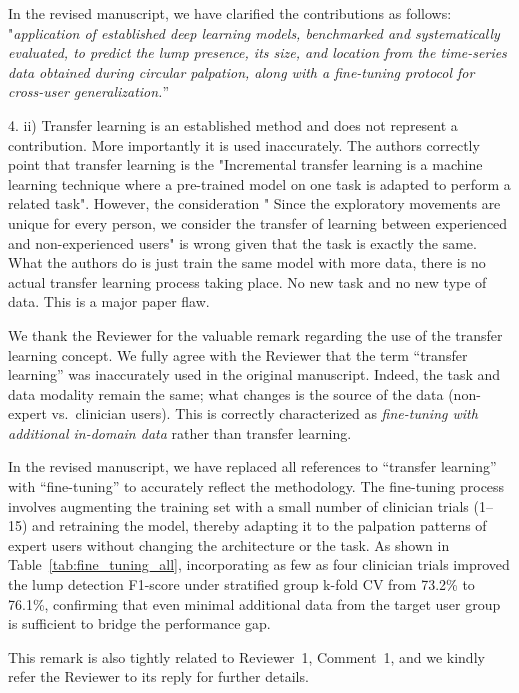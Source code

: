 \documentclass[a4paper, onecolumn]{IEEEtran}
\newcommand\blue[1]{{\textcolor{white!30!blue}{#1}}}
\begin{document}
In the revised manuscript, we have clarified the contributions as follows:
"\textit{application of established deep learning models, benchmarked and systematically evaluated, to predict the lump presence, its size, and location from the time-series data obtained during circular palpation, along with a fine-tuning protocol for cross-user generalization.}''

\blue{4. ii) Transfer learning is an established method and does not represent a contribution. More importantly it is used inaccurately. The authors correctly point that transfer learning is the "Incremental transfer learning is a machine learning technique where a pre-trained model on one task is adapted to perform a related task". However, the consideration " Since the exploratory movements are unique for every person, we consider the transfer of learning between experienced and non-experienced users" is wrong given that the task is exactly the same. What the authors do is just train the same model with more data, there is no actual transfer learning process taking place. No new task and no new type of data. This is a major paper flaw.}

We thank the Reviewer for the valuable remark regarding the use of the transfer learning concept. We fully agree with the Reviewer that the term ``transfer learning'' was inaccurately used in the original manuscript. Indeed, the task and data modality remain the same; what changes is the source of the data (non-expert vs.~clinician users). This is correctly characterized as \textit{fine-tuning with additional in-domain data} rather than transfer learning.

In the revised manuscript, we have replaced all references to ``transfer learning'' with ``fine-tuning'' to accurately reflect the methodology. The fine-tuning process involves augmenting the training set with a small number of clinician trials (1--15) and retraining the model, thereby adapting it to the palpation patterns of expert users without changing the architecture or the task. As shown in Table~\ref{tab:fine_tuning_all}, incorporating as few as four clinician trials improved the lump detection F1-score under stratified group k-fold CV from 73.2\% to 76.1\%, confirming that even minimal additional data from the target user group is sufficient to bridge the performance gap.

This remark is also tightly related to Reviewer~1, Comment~1, and we kindly refer the Reviewer to its reply for further details.
\end{document}
